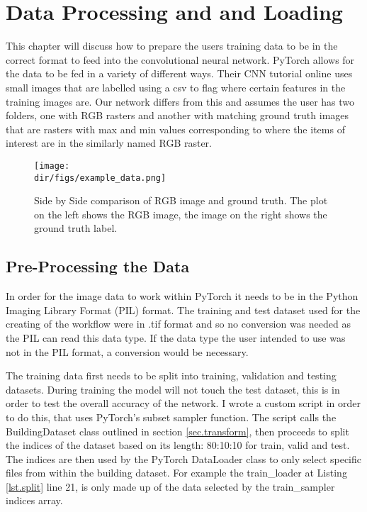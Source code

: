 \chapter{Data Processing and and Loading}
This chapter will discuss how to prepare the users training data to be in the correct format to feed into the convolutional neural network. PyTorch allows for the data to be fed in a variety of different ways. Their CNN tutorial online uses small images that are labelled using a csv to flag where certain features in the training images are. Our network differs from this and assumes the user has two folders, one with RGB rasters and another with matching ground truth images that are rasters with max and min values corresponding to where the items of interest are in the similarly named RGB raster. 

\begin{figure}[htbp]
    \centering
    \texttt{[image: \\dir/figs/example\_data.png]}
    \caption[Side by Side comparison of RGB image and ground truth]{Side by Side comparison of RGB image and ground truth. The plot on the left shows the RGB image, the image on the right shows the ground truth label.}
    \label{fig.example_data}
\end{figure}


\section{Pre-Processing the Data}
In order for the image data to work within PyTorch it needs to be in the Python Imaging Library Format (PIL) format. The training and test dataset used for the creating of the workflow were in .tif format and so no conversion was needed as the PIL can read this data type. If the data type the user intended to use was not in the PIL format, a conversion would be necessary.
\par
The training data first needs to be split into training, validation and testing datasets. During training the model will not touch the test dataset, this is in order to test the overall accuracy of the network. I wrote a custom script in order to do this, that uses PyTorch's subset sampler function. The script calls the BuildingDataset class outlined in section \ref{sec.transform}, then proceeds to split the indices of the dataset based on its length: 80:10:10 for train, valid and test. The indices are then used by the PyTorch DataLoader class to only select specific files from within the building dataset. For example the train\_loader at  Listing \ref{lst.split} line 21, is only made up of the data selected by the train\_sampler indices array. 

